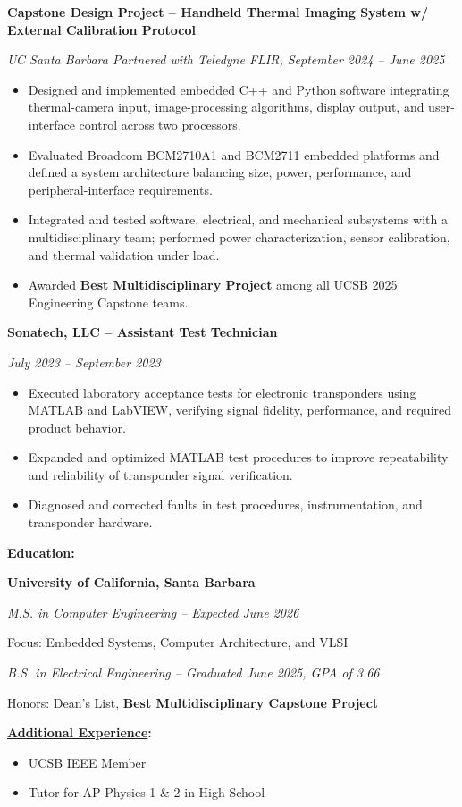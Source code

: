 \documentclass[letterpaper,10pt]{article}
\newcommand{\resumesection}[1]{%
  \vspace{6pt plus 1fill}%
  {\fontsize{11}{13}\selectfont\textbf{\underline{#1}:}}\par
  \vspace{3pt}%
}
\newcommand{\role}[2]{%
  {\fontsize{9.7}{12}\selectfont\textbf{#1}}\par
  {\fontsize{9.7}{12}\selectfont\textit{#2}}\par
}
\newenvironment{skillitems}{%
  \begin{itemize}[
    label=\textbullet,
    leftmargin=0.50in,
    labelsep=0.12in,
    itemsep=1.5pt,
    topsep=0pt,
    parsep=0pt,
    partopsep=0pt
  ]%
  \fontsize{9.7}{12}\selectfont
}{\end{itemize}}
\newenvironment{experienceitems}{%
  \begin{itemize}[
    label=\textbullet,
    leftmargin=1.50in,
    labelsep=0.12in,
    itemsep=1.5pt,
    topsep=0pt,
    parsep=0pt,
    partopsep=0pt
  ]%
  \fontsize{9.7}{12}\selectfont
}{\end{itemize}}
\begin{document}
\vspace{3pt}
\role{Capstone Design Project -- Handheld Thermal Imaging System w/ External Calibration Protocol}
     {UC Santa Barbara \textbar{} Partnered with Teledyne FLIR, September 2024 -- June 2025}
\begin{experienceitems}
  \item Designed and implemented embedded C++ and Python software integrating thermal-camera input,
        image-processing algorithms, display output, and user-interface control across two processors.
  \item Evaluated Broadcom BCM2710A1 and BCM2711 embedded platforms and defined a system
        architecture balancing size, power, performance, and peripheral-interface requirements.
  \item Integrated and tested software, electrical, and mechanical subsystems with a multidisciplinary
        team; performed power characterization, sensor calibration, and thermal validation under load.
  \item Awarded \textbf{Best Multidisciplinary Project} among all UCSB 2025 Engineering Capstone teams.
\end{experienceitems}

\vspace{3pt}
\role{Sonatech, LLC -- Assistant Test Technician}
     {July 2023 -- September 2023}
\begin{experienceitems}
  \item Executed laboratory acceptance tests for electronic transponders using MATLAB and LabVIEW,
        verifying signal fidelity, performance, and required product behavior.
  \item Expanded and optimized MATLAB test procedures to improve repeatability and reliability of
        transponder signal verification.
  \item Diagnosed and corrected faults in test procedures, instrumentation, and transponder hardware.
\end{experienceitems}

\resumesection{Education}
{\fontsize{9.7}{12}\selectfont
\hspace*{0.50in}\textbf{University of California, Santa Barbara}\par
\hspace*{0.50in}\textit{M.S. in Computer Engineering -- Expected June 2026}\par
\hspace*{0.50in}Focus: Embedded Systems, Computer Architecture, and VLSI\par
\vspace{5pt}
\hspace*{0.50in}\textit{B.S. in Electrical Engineering -- Graduated June 2025, GPA of 3.66}\par
\hspace*{0.50in}Honors: Dean's List, \textbf{Best Multidisciplinary Capstone Project}\par
}

\resumesection{Additional Experience}
\begin{skillitems}
  \item UCSB IEEE Member
  \item Tutor for AP Physics 1 \& 2 in High School
\end{skillitems}
\end{document}

